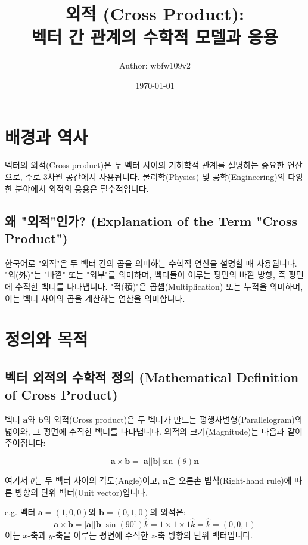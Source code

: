 \documentclass[12pt]{article}
\title{
    외적 (Cross Product): \\
    벡터 간 관계의 수학적 모델과 응용
}
\author{Author: wbfw109v2}
\date{\today}
\begin{document}
\maketitle
\tableofcontents

\section{배경과 역사}

\noindent 벡터의 외적(Cross product)은 두 벡터 사이의 기하학적 관계를 설명하는 중요한 연산으로, 주로 3차원 공간에서 사용됩니다. 물리학(Physics) 및 공학(Engineering)의 다양한 분야에서 외적의 응용은 필수적입니다.

\subsection{왜 "외적"인가? (Explanation of the Term "Cross Product")}

\noindent 한국어로 "외적"은 두 벡터 간의 곱을 의미하는 수학적 연산을 설명할 때 사용됩니다. "외(外)"는 "바깥" 또는 "외부"를 의미하며, 벡터들이 이루는 평면의 바깥 방향, 즉 평면에 수직한 벡터를 나타냅니다. "적(積)"은 곱셈(Multiplication) 또는 누적을 의미하며, 이는 벡터 사이의 곱을 계산하는 연산을 의미합니다.

\section{정의와 목적}

\subsection{벡터 외적의 수학적 정의 (Mathematical Definition of Cross Product)}

\noindent 벡터 \(\mathbf{a}\)와 \(\mathbf{b}\)의 외적(Cross product)은 두 벡터가 만드는 평행사변형(Parallelogram)의 넓이와, 그 평면에 수직한 벡터를 나타냅니다. 외적의 크기(Magnitude)는 다음과 같이 주어집니다:

\[
  \mathbf{a} \times \mathbf{b} = |\mathbf{a}| |\mathbf{b}| \sin(\theta) \mathbf{n}
\]

\noindent 여기서 \(\theta\)는 두 벡터 사이의 각도(Angle)이고, \(\mathbf{n}\)은 오른손 법칙(Right-hand rule)에 따른 방향의 단위 벡터(Unit vector)입니다.

\vspace{1\baselineskip}
\noindent {} e.g. 벡터 \(\mathbf{a} = (1, 0, 0)\)와 \(\mathbf{b} = (0, 1, 0)\)의 외적은:
\[
  \mathbf{a} \times \mathbf{b} = |\mathbf{a}| |\mathbf{b}| \sin(90^\circ) \hat{k} = 1 \times 1 \times 1 \hat{k} = \hat{k} = (0, 0, 1)
\]
이는 \(x\)-축과 \(y\)-축을 이루는 평면에 수직한 \(z\)-축 방향의 단위 벡터입니다.
\end{document}

